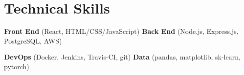 \documentclass[a4paper,10pt]{article}
\begin{document}
\section{Technical Skills}

\textbf{Front End} (React, HTML/CSS/JavaScript) \quad\quad\thinspace\thinspace\thinspace\thinspace \textbf{Back End} (Node.js, Express.js, PostgreSQL, AWS)

\textbf{DevOps} (Docker, Jenkins, Travis-CI, git) \quad\quad\thinspace\thinspace\thinspace\thinspace\thinspace \textbf{Data} (pandas, matplotlib, sk-learn, pytorch)
\end{document}
